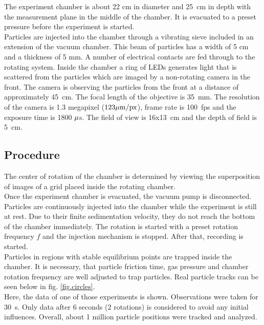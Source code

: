 {The experiment chamber is about 22 cm in diameter and 25~cm in depth with the measurement plane in the middle of the chamber.} It is evacuated to a preset pressure before the experiment is started.\\
{Particles are injected into the chamber through a vibrating sieve included in
an extension of the vacuum chamber. This beam of particles has a width of 5 cm and 
a thickness of 5 mm.}
A number of electrical contacts are fed through to the rotating system. Inside the chamber a ring of LEDs generates light that is scattered from the particles which are imaged by a non-rotating camera in the front.
{The camera is observing the particles from the front at a distance of approximately 45~cm. The focal length of the objective is 35~mm. {The resolution of the camera is 1.3 megapixel ($123  \rm \mu m/px$),} frame rate is 100~fps and the exposure time is 1800 $\rm \mu$s. The field of view is 16x13~cm and the depth of field is 5~cm. }











{\subsection{Procedure}
The center of rotation of the chamber is determined by viewing the superposition of images of a grid placed inside the rotating chamber.\\
Once the experiment chamber is evacuated, the vacuum pump is disconnected.
Particles are continuously injected into the chamber while the experiment is still at rest. Due to their finite sedimentation velocity, they do not reach the bottom of the chamber immediately. The rotation is started with a preset rotation frequency $f$ and the injection mechanism is stopped. After that, recording is started.\\
Particles in regions with stable equilibrium points are trapped inside the chamber. It is necessary, that particle friction time, gas pressure and chamber rotation frequency are well adjusted to trap particles. Real particle tracks can be seen below in fig. \ref{fig.circles}.\\
Here, the data of one of those experiments is shown. Observations were taken for 30~s. Only data after 6 seconds (2 rotations) is considered to avoid any initial influences. Overall, about 1 million particle positions were tracked and analyzed.}\\



